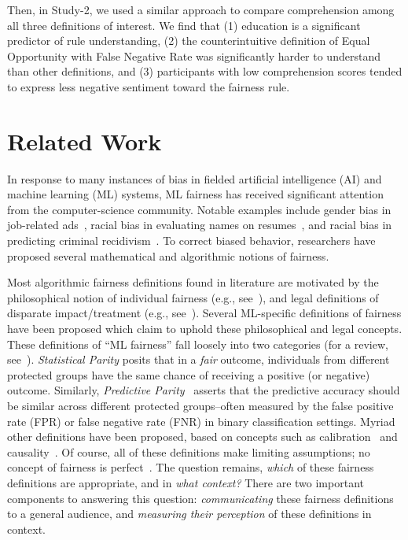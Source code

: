 \documentclass{article}
\newcommand{\studyB}{Study-2}
\newcommand{\newdcm}[1]{{\color{blue}{NEW-DCM: #1}}}
\newcommand{\newdcm}[1]{#1}
\begin{document}
Then, in \studyB{}, we used a similar approach to compare comprehension among all three definitions of interest. We find that (1) education is a significant predictor of rule understanding, (2) the counterintuitive definition of Equal Opportunity with False Negative Rate was significantly harder to understand than other definitions, and (3) participants with low comprehension scores tended to express less negative sentiment toward the fairness rule.
\newdcm{This underlines the importance of considering stakeholders before deploying a ``fair'' ML system, because some stakeholders may not understand or agree with an ML-specific notion of fairness. 
Our goal is to help to designers and adopters of fairness approaches understand whether they are communicating with stakeholders effectively. 
}

\section{Related Work}\label{sec:related}



In response to many instances of bias in fielded artificial intelligence (AI) and machine learning (ML) systems,  ML fairness has received significant attention from the computer-science community.
Notable examples include gender bias in job-related ads~\cite{datta2015automated}, racial bias in evaluating names on resumes~\cite{caliskan2017semantics}, and racial bias in predicting criminal recidivism~\cite{angwin2016machine}.
To correct  biased behavior, researchers have proposed several mathematical and algorithmic notions of fairness. 


Most algorithmic fairness definitions found in literature are motivated by the philosophical notion of individual fairness (e.g., see~\cite{Rawls71a}), and legal definitions of disparate impact/treatment (e.g., see~\cite{barocas2016big}). 
Several ML-specific definitions of fairness have been proposed which claim to uphold these philosophical and legal concepts. 
These definitions of ``ML fairness'' fall loosely into two categories (for a review, see~\cite{chouldechova2018frontiers}). \emph{Statistical Parity} posits that in a \emph{fair} outcome, individuals from different protected groups have the same chance of receiving a positive (or negative) outcome.
Similarly, \emph{Predictive Parity}~\cite{Hardt16:Equality} asserts that the predictive accuracy should be similar across different protected groups--often measured by the false positive rate (FPR) or false negative rate (FNR) in binary classification settings. 
Myriad other definitions have been proposed, based on concepts such as calibration~\cite{pleiss2017fairness} and causality~\cite{kusner2017counterfactual}. 
Of course, all of these definitions make limiting assumptions; no concept of fairness is perfect~\cite{Hardt16:Equality}. The question remains, \emph{which} of these fairness definitions are appropriate, and in \emph{what context?}
There are two important components to answering this question: \emph{communicating} these fairness definitions to a general audience, and \emph{measuring their perception} of these definitions in context.
\end{document}
